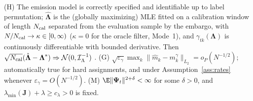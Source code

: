 \begin{assumption}
\label{ass:hmm_gram}
(H) The emission model is correctly specified and identifiable up to label permutation; $\hat{\boldsymbol\Lambda}$ is the (globally maximizing) MLE fitted on a calibration window of length $N_{\rm cal}$ separated from the evaluation sample by the embargo, with $N/N_{\rm cal}\to\kappa\in[0,\infty)$ ($\kappa=0$ for the oracle filter, Mode~1), and $\gamma_{tk}(\boldsymbol\Lambda)$ is continuously differentiable with bounded derivative. Then $\sqrt{N_{\rm cal}}(\hat{\boldsymbol\Lambda}-\boldsymbol\Lambda^*)\Rightarrow\mathcal N(0,\mathcal I_\Lambda^{-1})$ \citep{leroux1992maximum,bickel1998asymptotic,douc2004asymptotic}.
(G) $\sqrt{\varepsilon_\gamma}\max_k\|\hat m_k-m_k^\gamma\|_{L_2}=o_P(N^{-1/2})$; automatically true for hard assignments, and under Assumption~\ref{ass:rates} whenever $\varepsilon_\gamma=O(N^{-1/2})$.
(M) $\E\|\boldsymbol\Psi_t\|^{2+\delta}<\infty$ for some $\delta>0$, and $\lambda_{\min}(\boldsymbol J)+\lambda\ge c_\lambda>0$ is fixed.
\end{assumption}

